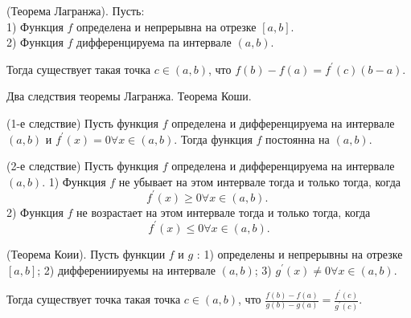 \begin{theorem}
    (Теорема Лагранжа). Пусть:\\
    1) Функция $f$ определена и непрерывна на отрезке $[a, b]$.\\
    2) Функция $f$ дифференцируема па интервале $(a, b)$.

    Тогда существует такая точка $c \in(a, b)$, что $f(b)-f(a)=f^{\prime}(c)(b-a)$.
\end{theorem}

\newpage

\begin{problem}
Два следствия теоремы Лагранжа. Теорема Коши.\end{problem}
\begin{proposition}
    (1-е следствие) Пусть функция $f$ определена и дифференцируема на интервале $(a, b)$ и $f^{\prime}(x)=0 \forall x \in(a, b)$. Тогда функция $f$ постоянна на $(a, b)$.
\end{proposition}

\begin{proposition}
    (2-е следствие) Пусть функция $f$ определена и дифференцируема на интервале $(a, b)$.
    1) Функция $f$ не убывает на этом интервале тогда и только тогда, когда
    $$
        f^{\prime}(x) \geq 0 \forall x \in(a, b) \text {. }
    $$
    2) Функция $f$ не возрастает на этом интервале тогда и только тогда, когда
    $$
        f^{\prime}(x) \leq 0 \forall x \in(a, b) .
    $$
\end{proposition}

\begin{theorem}
    (Теорема Коии). Пусть функции $f$ и $g$ :
    1) определены и непрерывны на отрезке $[a, b]$;
    2) дифферениируемы на интервале $(a, b)$;
    3) $g^{\prime}(x) \neq 0 \forall x \in(a, b)$.

    Тогда существует точка такая точка $c \in(a, b)$, что $\frac{f(b)-f(a)}{g(b)-g(a)}=\frac{f^{\prime}(c)}{g^{\prime}(c)}$.
\end{theorem}
